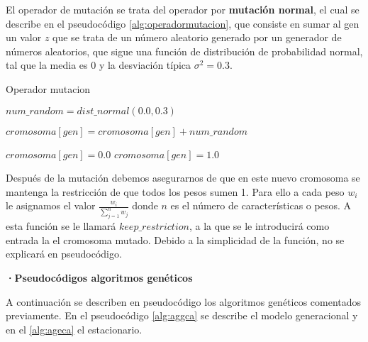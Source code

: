 El operador de mutación se trata del operador por \textbf{mutación normal},  el cual se describe en el pseudocódigo \ref{alg:operadormutacion}, que consiste en sumar al gen un valor $z$ que se trata de un número aleatorio generado por un generador de números aleatorios, que sigue una función de distribución de probabilidad normal, tal que la media es 0 y la desviación típica $\sigma^2=0.3$. 
\begin{algorithm} [H]
	\caption{Operador mutacion}
	\label{alg:operadormutacion}
	\begin{algorithmic}[1]
		
\State	$num\_random = dist\_normal(0.0,0.3)$
	
		\State$ cromosoma[gen] = cromosoma[gen] + num\_random$
		
		\State
		\State $cromosoma[gen] = 0.0$
		\EndIf
		\State $cromosoma[gen] = 1.0$
		\EndIf
		\EndProcedure
	\end{algorithmic}
\end{algorithm}

Después de la mutación debemos asegurarnos de que en este nuevo cromosoma se mantenga la restricción de que todos los pesos sumen 1. Para ello a cada peso $w_i$ le asignamos el valor $\frac{w_i}{\sum_{j=1}^{n}w_j}$ donde $n$ es el número de características o pesos. A esta función se le llamará $keep\_restriction$, a la que se le introducirá como entrada la el cromosoma mutado. Debido a la simplicidad de la función, no se explicará en pseudocódigo.

\newpage
\textbf{·Pseudocódigos algoritmos genéticos}

A continuación se describen en pseudocódigo los algoritmos genéticos comentados previamente. En el pseudocódigo \ref{alg:aggca} se describe el modelo generacional y en el \ref{alg:ageca} el estacionario.


